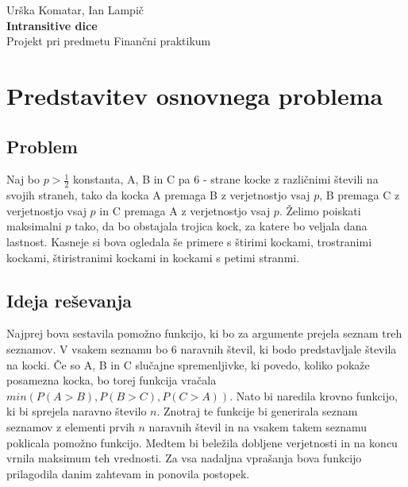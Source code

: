 \documentclass[12pt,a4paper]{amsart}
\begin{document}
    
\thispagestyle{empty}
\vfill

\begin{center}{\large
Urška Komatar, Ian Lampič\\[2mm]
{\Huge \bf Intransitive dice}\\[5mm]
Projekt pri predmetu Finančni praktikum\\[1cm]}
\end{center}
\vfill

\pagebreak

\tableofcontents
\pagebreak


\section{Predstavitev osnovnega problema}
\subsection{Problem}
Naj bo $p > \frac{1}{2}$ konstanta, A, B in C pa 6 - strane kocke z različnimi števili na svojih straneh, tako da kocka A premaga
B z verjetnostjo vsaj $p$, B premaga C z verjetnostjo vsaj $p$ in C premaga A z verjetnostjo vsaj $p$. Želimo poiskati maksimalni $p$ tako, 
da bo obstajala trojica kock, za katere bo veljala dana lastnost. Kasneje si bova ogledala še primere s štirimi kockami, trostranimi kockami, štiristranimi kockami
in kockami s petimi stranmi.

\subsection{Ideja reševanja}
Najprej bova sestavila pomožno funkcijo, ki bo za argumente prejela seznam treh seznamov. V vsakem seznamu bo 6 naravnih števil, ki bodo predstavljale števila na kocki. Če so A, B in C slučajne spremenljivke, ki povedo, koliko pokaže posamezna kocka, bo torej funkcija vračala $min(P(A>B), P(B>C), P(C>A))$. Nato bi naredila krovno funkcijo, ki bi sprejela
naravno število $n$. Znotraj te funkcije bi generirala seznam seznamov z elementi prvih $n$ naravnih števil in na vsakem takem seznamu poklicala pomožno funkcijo.
Medtem bi beležila dobljene verjetnosti in na koncu vrnila maksimum teh vrednosti. Za vsa nadaljna vprašanja bova funkcijo prilagodila danim zahtevam in ponovila postopek.
\end{document}
